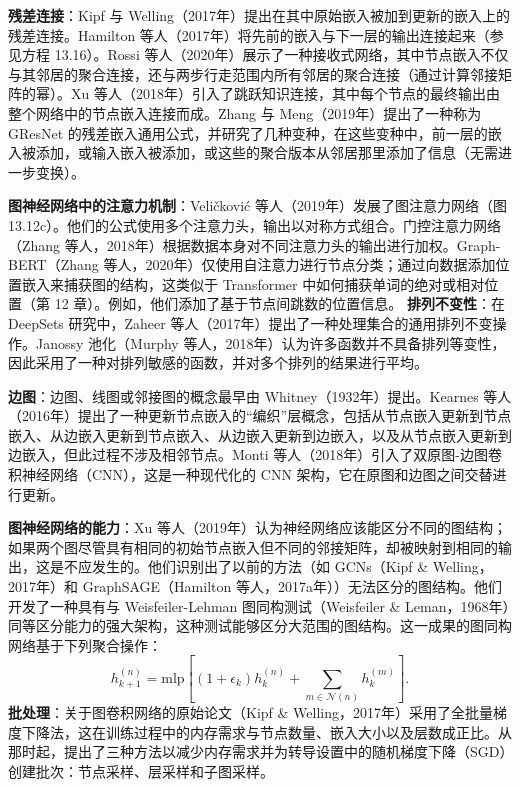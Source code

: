 \textbf{残差连接}：Kipf 与 Welling（2017年）提出在其中原始嵌入被加到更新的嵌入上的残差连接。Hamilton 等人（2017年）将先前的嵌入与下一层的输出连接起来（参见方程 13.16）。Rossi 等人（2020年）展示了一种接收式网络，其中节点嵌入不仅与其邻居的聚合连接，还与两步行走范围内所有邻居的聚合连接（通过计算邻接矩阵的幂）。Xu 等人（2018年）引入了跳跃知识连接，其中每个节点的最终输出由整个网络中的节点嵌入连接而成。Zhang 与 Meng（2019年）提出了一种称为 GResNet 的残差嵌入通用公式，并研究了几种变种，在这些变种中，前一层的嵌入被添加，或输入嵌入被添加，或这些的聚合版本从邻居那里添加了信息（无需进一步变换）。

\textbf{图神经网络中的注意力机制}：Veličković 等人（2019年）发展了图注意力网络（图 13.12c）。他们的公式使用多个注意力头，输出以对称方式组合。门控注意力网络（Zhang 等人，2018年）根据数据本身对不同注意力头的输出进行加权。Graph-BERT（Zhang 等人，2020年）仅使用自注意力进行节点分类；通过向数据添加位置嵌入来捕获图的结构，这类似于 Transformer 中如何捕获单词的绝对或相对位置（第 12 章）。例如，他们添加了基于节点间跳数的位置信息。
\textbf{排列不变性}：在 DeepSets 研究中，Zaheer 等人（2017年）提出了一种处理集合的通用排列不变操作。Janossy 池化（Murphy 等人，2018年）认为许多函数并不具备排列等变性，因此采用了一种对排列敏感的函数，并对多个排列的结果进行平均。

\textbf{边图}：边图、线图或邻接图的概念最早由 Whitney（1932年）提出。Kearnes 等人（2016年）提出了一种更新节点嵌入的“编织”层概念，包括从节点嵌入更新到节点嵌入、从边嵌入更新到节点嵌入、从边嵌入更新到边嵌入，以及从节点嵌入更新到边嵌入，但此过程不涉及相邻节点。Monti 等人（2018年）引入了双原图-边图卷积神经网络（CNN），这是一种现代化的 CNN 架构，它在原图和边图之间交替进行更新。

\textbf{图神经网络的能力}：Xu 等人（2019年）认为神经网络应该能区分不同的图结构；如果两个图尽管具有相同的初始节点嵌入但不同的邻接矩阵，却被映射到相同的输出，这是不应发生的。他们识别出了以前的方法（如 GCNs（Kipf \& Welling，2017年）和 GraphSAGE（Hamilton 等人，2017a年））无法区分的图结构。他们开发了一种具有与 Weisfeiler-Lehman 图同构测试（Weisfeiler \& Leman，1968年）同等区分能力的强大架构，这种测试能够区分大范围的图结构。这一成果的图同构网络基于下列聚合操作：
\begin{equation}
h^{(n)}_{k+1} = \text{mlp} \left[ \left(1 + \epsilon_k\right) h^{(n)}_k + \sum_{m\in\mathcal{N}(n)} h^{(m)}_k \right]. 
\end{equation}
\textbf{批处理}：关于图卷积网络的原始论文（Kipf \& Welling，2017年）采用了全批量梯度下降法，这在训练过程中的内存需求与节点数量、嵌入大小以及层数成正比。从那时起，提出了三种方法以减少内存需求并为转导设置中的随机梯度下降（SGD）创建批次：节点采样、层采样和子图采样。

